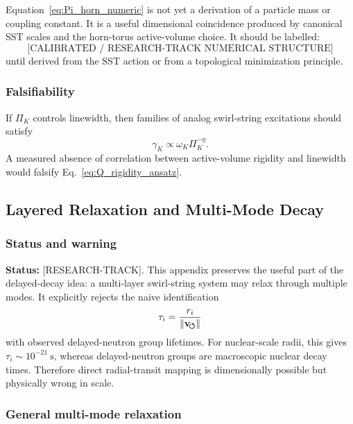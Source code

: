         Equation~\eqref{eq:Pi_horn_numeric} is not yet a derivation of a particle mass or coupling constant. It is a useful dimensional coincidence produced by canonical SST scales and the horn-torus active-volume choice. It should be labelled:
        \[
            \boxed{
                \text{[CALIBRATED / RESEARCH-TRACK NUMERICAL STRUCTURE]}
            }
        \]
        until derived from the SST action or from a topological minimization principle.
    
    \subsubsection*{Falsifiability}
        
        If \(\Pi_K\) controls linewidth, then families of analog swirl-string excitations should satisfy
        \[
            \gamma_K \propto \omega_K \Pi_K^{-\eta}.
        \]
        A measured absence of correlation between active-volume rigidity and linewidth would falsify Eq.~\eqref{eq:Q_rigidity_ansatz}.

\subsection{Layered Relaxation and Multi-Mode Decay}
    \label{app:layered-relaxation}
    
    \subsubsection*{Status and warning}
        
        \noindent
        \textbf{Status:} [RESEARCH-TRACK].
        This appendix preserves the useful part of the delayed-decay idea: a multi-layer swirl-string system may relax through multiple modes. It explicitly rejects the naive identification
        \[
            \tau_i = \frac{r_i}{\lVert\mathbf{v}_{\!\boldsymbol{\circlearrowleft}}\rVert}
        \]
        with observed delayed-neutron group lifetimes. For nuclear-scale radii, this gives \(\tau_i\sim 10^{-21}\ \mathrm{s}\), whereas delayed-neutron groups are macroscopic nuclear decay times. Therefore direct radial-transit mapping is dimensionally possible but physically wrong in scale.
    
    \subsubsection*{General multi-mode relaxation}
        
